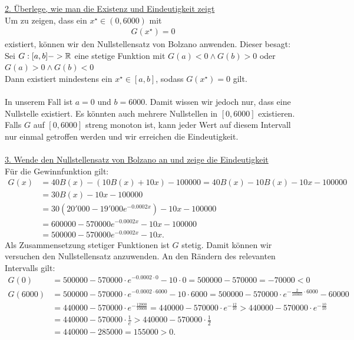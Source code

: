 \underline{2. Überlege, wie man die Existenz und Eindeutigkeit zeigt}\\
Um zu zeigen, dass ein $x^\star  \in (0,6000)$ mit
\begin{align*}
	G(x^\star)= 0
\end{align*}
existiert, können wir den Nullstellensatz von Bolzano anwenden. Dieser besagt:\\
Sei $G:[a,b] -> \mathbb{R}$ eine stetige Funktion mit $G(a) < 0 \wedge G(b) > 0 $ oder $G(a) > 0 \wedge G(b) < 0$\\
Dann existiert mindestens ein $x^\star \in [a,b]$, sodass $G(x^\star) = 0$ gilt.\\
\\
In unserem Fall ist $a = 0 $ und $b = 6000$.
Damit wissen wir jedoch nur, dass eine Nullstelle existiert. Es könnten auch mehrere Nullstellen in $[0,6000]$ existieren. 
Falls $G $ auf $[0,6000]$ streng monoton ist, kann jeder Wert auf diesem Intervall nur einmal getroffen werden und wir erreichen die Eindeutigkeit.\\
\\
\underline{3. Wende den Nullstellensatz von Bolzano an und zeige die Eindeutigkeit}\\
Für die Gewinnfunktion gilt:
\begin{align*}
	G(x)
	&= 
	40 B(x) 
	- ( 10 B(x) + 10 x) - 100000
	= 
	40 B(x) 
	-  10 B(x) -10 x - 100000\\
	&=
	30 B(x) - 10 x - 100000\\
	&=
	30 
	\left(
	20'000 - 19'000 e^{-0.0002 x }
	\right)
	- 10x - 100000\\
	&=
	600000 - 570000 e^{-0.0002 x } - 10 x - 100000\\
	&= 
	500000 - 570000 e^{-0.0002 x } - 10 x.
\end{align*}
Als Zusammensetzung stetiger Funktionen ist $G$ stetig. Damit können wir versuchen den Nullstellensatz anzuwenden. An den Rändern des relevanten Intervalls gilt:
\begin{align*}
	G(0) 
	&= 500000 - 570000 \cdot e^{-0.0002 \cdot 0 } - 10 \cdot  0
	= 500000 - 570000  = - 70000 < 0 \\
	G(6000)
	&=
	500000 - 570000 \cdot e^{-0.0002 \cdot 6000 } - 10 \cdot 6000
	=
	500000 - 570000 \cdot e^{-\frac{2}{10000} \cdot 6000 } - 60000\\
	&=
	440000 - 570000 \cdot e^{-\frac{12000}{10000}  } 
	=
	440000 - 570000 \cdot e^{-\frac{12}{10}  } 
	>
	440000 - 570000 \cdot e^{-\frac{10}{10}  } \\
	&=
	440000 - 570000 \cdot \frac{1}{e}
	>
	440000 - 570000 \cdot \frac{1}{2}\\
	&= 440000 - 285000 = 155000 > 0.
\end{align*}

